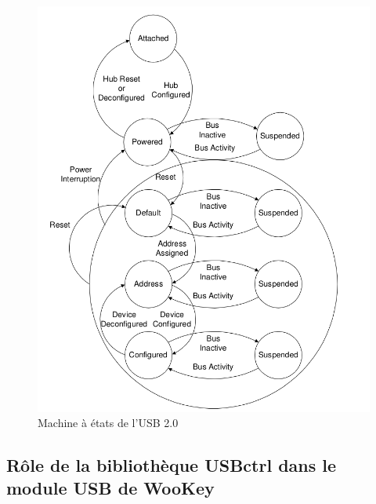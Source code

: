 \begin{figure}[!h]
\centering
\includegraphics[width=16cm]{images/machine_etat_USB2.png}
\caption{Machine à états de l'USB 2.0}
\label{Machine à états de l'USB 2.0}
\end{figure}


\subsection{Rôle de la bibliothèque USBctrl dans le module USB de WooKey}

